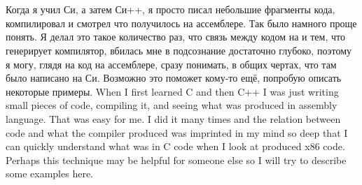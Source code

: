 \chapter{}

\IFRU
{Когда я учил Си, а затем Си++, я просто писал небольшие фрагменты кода, компилировал и смотрел что 
получилось на ассемблере. Так было намного проще понять. Я делал это такое количество раз, 
что связь между кодом на \CCpp и тем, что генерирует компилятор, вбилась мне в подсознание достаточно 
глубоко, поэтому я могу, глядя на код на ассемблере, сразу понимать, в общих чертах, что там было написано 
на Си. Возможно это поможет кому-то ещё, попробую описать некоторые примеры.}
{When I first learned C and then C++ I was just writing small pieces of code, compiling it, 
and seeing what 
was produced in assembly language. That was easy for me. I did it many times and the relation 
between \CCpp code and what the compiler produced was imprinted in my mind so deep that 
I can quickly understand what was in C code when I look at produced x86 code. 
Perhaps this technique may be helpful for someone else so I will try to describe some examples here.}



























